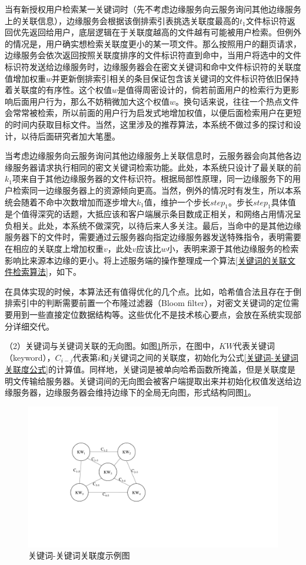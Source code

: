 \documentclass[promaster]{thesis-uestc}
\begin{document}
当有新授权用户检索某一关键词时（先不考虑边缘服务向云服务询问其他边缘服务上的关联信息），边缘服务会根据该倒排索引表挑选关联度最高的$t_1$文件标识符返回优先返回给用户，底层逻辑在于关联度越高的文件越有可能被用户检索。但例外的情况是，用户确实想检索关联度更小的某一项文件。那么按照用户的翻页请求，边缘服务会依次返回按照关联度排序的文件标识符直到命中，当用户将选中的文件标识符发送给边缘服务时，边缘服务器会在密文关键词和命中文件标识符的关联度值增加权重$w$并更新倒排索引相关的条目保证包含该关键词的文件标识符依旧保持着关联度的有序性。这个权值$w$是值得周密设计的，倘若前面用户的检索行为更影响后面用户行为，那么不妨稍微加大这个权值$w$。换句话来说，往往一个热点文件会常常被检索，所以前面的用户行为启发式地增加权值，以便后面检索用户在更短的时间内获取目标文件。当然，这里涉及的推荐算法，本系统不做过多的探讨和设计，以待后面研究者加大笔墨。

当考虑边缘服务向云服务询问其他边缘服务上关联信息时，云服务器会向其他各边缘服务器请求执行相同的密文关键词检索功能。此处，本系统只设计了最关联的前$k_1$项来自于其他边缘服务器的文件标识符。根据局部性原理，同一边缘服务下的用户检索同一边缘服务器上的资源倾向更高。当然，例外的情况时有发生，所以本系统会随着不命中次数增加而逐步增大$k_1$值，维护一个步长$step_1$。步长$step_1$具体值是个值得深究的话题，大抵应该和客户端展示条目数成正相关，和网络占用情况呈负相关。此处，本系统不做深究，以待后来人多关注。最后，当命中的是其他边缘服务器下的文件时，需要通过云服务器向指定边缘服务器发送特殊指令，表明需要在相应的关联度上增加权重$v$，此处$v$应该比$w$小，表明来源于其他边缘服务的检索影响比来源本边缘的更小。将上述服务端的操作整理成一个算法\ref{关键词的关联文件检索算法}，如下。

在具体实现的时候，本算法还有值得优化的几个点。比如，哈希值合法且存在于倒排索引中的判断需要前置一个布隆过滤器（Bloom filter），对密文关键词的定位需要用到一些直接定位数据结构等。这些优化不是技术核心要点，会放在系统实现部分详细交代。

（2）关键词与关键词关联的无向图。如图\ref{关键词-关键词关联度示例图}所示，在图中，$KW$代表关键词（keyword），$C_{i-j}$代表第$i$和$j$关键词之间的关联度，初始化为公式\ref{关键词-关键词关联度公式}的计算值。同样地，关键词是被单向哈希函数所掩盖，但是关联度是明文传输给服务器。关键词间的无向图会被客户端提取出来并初始化权值发送给边缘服务器，边缘服务器会维持边缘下的全局无向图，形式结构同图\ref{关键词-关键词关联度示例图}。
\begin{figure}[htbp]
    \centering
    \includegraphics[width = 0.45\linewidth]{pic/关键词关联度示例图.pdf}
    \caption{关键词-关键词关联度示例图}
    \label{关键词-关键词关联度示例图}
\end{figure}
\end{document}
